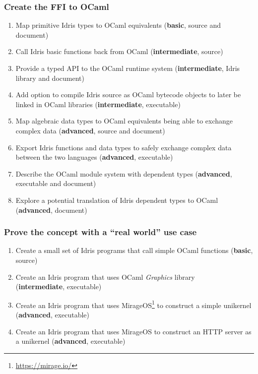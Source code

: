 \subsubsection{Create the FFI to OCaml}
\begin{enumerate}
    \item Map primitive Idris types to OCaml equivalents
          (\textbf{basic}, source and document)
    \item Call Idris basic functions
          back from OCaml (\textbf{intermediate}, source)
    \item Provide a typed API to the OCaml runtime system
          (\textbf{intermediate}, Idris library and document)
    \item Add option to compile Idris source as OCaml bytecode
          objects to later be linked in OCaml libraries
          (\textbf{intermediate}, executable)
    \item Map algebraic data types to OCaml equivalents
          being able to exchange complex data
          (\textbf{advanced}, source and document)
    \item Export Idris functions and data types to
          safely exchange complex data between the two languages
          (\textbf{advanced}, executable)
    \item Describe the OCaml module system with dependent types
          (\textbf{advanced}, executable and document)
    \item Explore a potential translation of Idris dependent types
          to OCaml (\textbf{advanced}, document)
\end{enumerate}

\subsubsection{Prove the concept with a ``real world'' use case}
\begin{enumerate}
    \item Create a small set of Idris programs that call simple
          OCaml functions (\textbf{basic}, source)
    \item Create an Idris program that uses OCaml \emph{Graphics}
          library \\ (\textbf{intermediate}, executable)
    \item Create an Idris program that uses MirageOS\footnote{\url{
                  https://mirage.io/}} to construct a simple
          unikernel (\textbf{advanced}, executable)
    \item Create an Idris program that uses MirageOS to construct an
          HTTP server as a unikernel (\textbf{advanced}, executable)
\end{enumerate}

